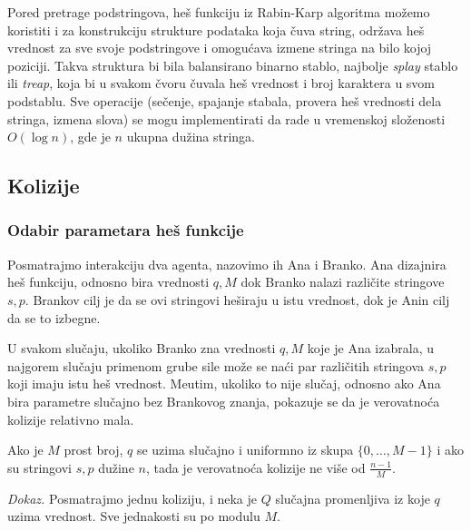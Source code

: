\noindent
\begin{minipage}[l]{\textwidth}

\end{minipage}

Pored pretrage podstringova, he\v s funkciju iz Rabin-Karp algoritma mo\v zemo koristiti i za konstrukciju strukture podataka koja \v cuva string, odr\v zava he\v s vrednost za sve svoje podstringove i omogu\' cava izmene stringa na bilo kojoj poziciji. Takva struktura bi bila balansirano binarno stablo, najbolje \textit{splay} stablo ili \textit{treap}, koja bi u svakom \v cvoru \v cuvala he\v s vrednost i broj karaktera u svom podstablu. Sve operacije (se\v cenje, spajanje stabala, provera he\v s vrednosti dela stringa, izmena slova) se mogu implementirati da rade u vremenskoj slo\v zenosti $O(\log n)$, gde je $n$ ukupna du\v zina stringa. 

\subsection{Kolizije}

\subsubsection{Odabir parametara he\v s funkcije}

Posmatrajmo interakciju dva agenta, nazovimo ih Ana i Branko. Ana dizajnira he\v s funkciju, odnosno bira vrednosti $q, M$ dok Branko nalazi razli\v cite stringove $s,p$. Brankov cilj je da se ovi stringovi he\v siraju u istu vrednost, dok je Anin cilj da se to izbegne.

U svakom slu\v caju, ukoliko Branko zna vrednosti $q,M$ koje je Ana izabrala, u najgorem slu\v caju primenom grube sile mo\v ze se na\' ci par razli\v citih stringova $s,p$ koji imaju istu he\v s vrednost. Me\dj utim, ukoliko to nije slu\v caj, odnosno ako Ana bira parametre slu\v cajno bez Brankovog znanja, pokazuje se da je verovatno\' ca kolizije relativno mala.

\begin{thm}
    Ako je $M$ prost broj, $q$ se uzima slu\v cajno i uniformno iz skupa $\{0, \ldots, M-1\}$ i ako su stringovi $s,p$ du\v zine $n$, tada je verovatno\' ca kolizije ne vi\v se od $\frac{n-1}{M}$.
\end{thm}

\textit{Dokaz.} Posmatrajmo jednu koliziju, i neka je $Q$ slu\v cajna promenljiva iz koje $q$ uzima vrednost. Sve jednakosti su po modulu $M$.


